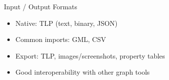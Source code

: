 \begin{frame}{Input / Output Formats}
	\begin{itemize}
		\item Native: TLP (text, binary, JSON)
		\item Common imports: GML, CSV
		\item Export: TLP, images/screenshots, property tables
		\item Good interoperability with other graph tools
	\end{itemize}
\end{frame}